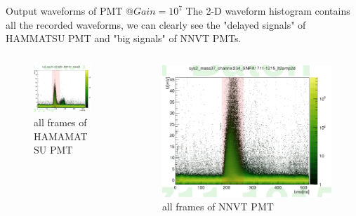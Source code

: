 \documentclass[11pt,compress,xcolor=x11names,UTF8]{beamer}
\begin{document}
\begin{frame}{Output waveforms of PMT @$Gain=10^7$}
The 2-D waveform histogram contains all the recorded waveforms, we can clearly see the "delayed signals" of HAMMATSU PMT and "big signals" of NNVT PMTs.
\begin{columns}
\begin{column}{.47\textwidth}
\begin{figure}
\centering
\includegraphics[width=\textwidth]{figures/wave2d.png} %
\caption{all frames of HAMAMATSU PMT}
\end{figure}
\end{column}
\begin{column}{.5\textwidth}
\begin{figure}
\centering
\includegraphics[width=\textwidth]{figures/mcpwave2d.png} %
\caption{all frames of NNVT PMT}
\end{figure}
\end{column}
\end{columns}
\end{frame}
\end{document}
